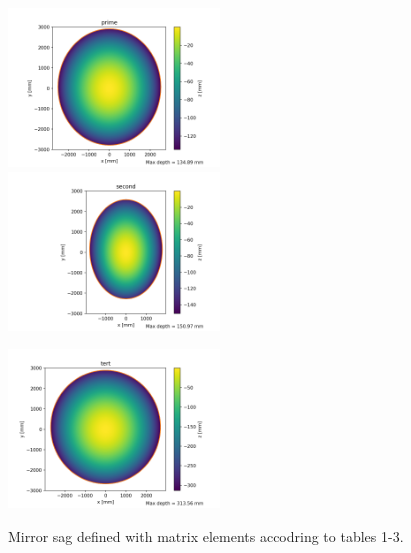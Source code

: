 \documentclass[12pt, letterpaper, twoside]{article}
\begin{document}
\begin{figure}
	\centering
	\includegraphics[width=0.5\textwidth]{./prime.png}\hfill
	\includegraphics[width=0.5\textwidth]{./second.png}
	
	\includegraphics[width=0.5\textwidth]{./tert.png}
	\label{fig:mirrorshape}
	\caption{Mirror sag defined with matrix elements accodring to tables 1-3.}
\end{figure}
\end{document}
